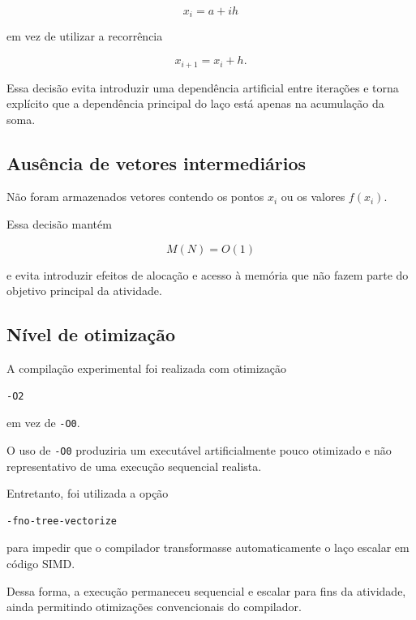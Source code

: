 \begin{equation}
    x_i=a+ih
\end{equation}

em vez de utilizar a recorrência

\begin{equation}
    x_{i+1}=x_i+h.
\end{equation}

Essa decisão evita introduzir uma dependência artificial entre iterações e
torna explícito que a dependência principal do laço está apenas na
acumulação da soma.

\subsection{Ausência de vetores intermediários}

Não foram armazenados vetores contendo os pontos \(x_i\) ou os valores
\(f(x_i)\).

Essa decisão mantém

\begin{equation}
    M(N)=O(1)
\end{equation}

e evita introduzir efeitos de alocação e acesso à memória que não fazem
parte do objetivo principal da atividade.

\subsection{Nível de otimização}

A compilação experimental foi realizada com otimização

\begin{verbatim}
-O2
\end{verbatim}

em vez de \texttt{-O0}.

O uso de \texttt{-O0} produziria um executável artificialmente pouco
otimizado e não representativo de uma execução sequencial realista.

Entretanto, foi utilizada a opção

\begin{verbatim}
-fno-tree-vectorize
\end{verbatim}

para impedir que o compilador transformasse automaticamente o laço escalar
em código SIMD.

Dessa forma, a execução permaneceu sequencial e escalar para fins da
atividade, ainda permitindo otimizações convencionais do compilador.

